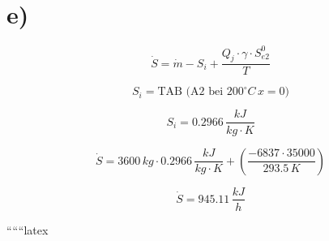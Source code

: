 

\section*{e)}

\[
\dot{S} = \dot{m} - S_i + \frac{Q_j \cdot \gamma \cdot S_{e2}^0}{T}
\]

\[
S_i = \text{TAB (A2 bei } 200^\circ C \, x = 0)
\]

\[
S_i = 0.2966 \, \frac{kJ}{kg \cdot K}
\]

\[
\dot{S} = 3600 \, kg \cdot 0.2966 \, \frac{kJ}{kg \cdot K} + \left( \frac{-6837 \cdot 35000}{293.5 \, K} \right)
\]

\[
\dot{S} = 945.11 \, \frac{kJ}{h}
\]

``````latex